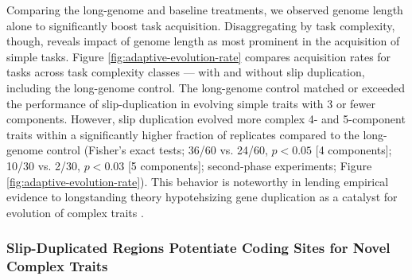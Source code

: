 Comparing the long-genome and baseline treatments, we observed genome length alone to significantly boost task acquisition.
Disaggregating by task complexity, though, reveals  impact of genome length as most prominent in the acquisition of simple tasks.
Figure \ref{fig:adaptive-evolution-rate} compares acquisition rates for tasks across task complexity classes --- with and without slip duplication, including the long-genome control.
The long-genome control matched or exceeded the performance of slip-duplication in evolving simple traits with 3 or fewer components.
However, slip duplication evolved more complex 4- and 5-component traits within a significantly higher fraction of replicates compared to the long-genome control (Fisher's exact tests; 36/60 vs. 24/60, $p<0.05$ [4 components]; 10/30 vs. 2/30, $p<0.03$ [5 components]; second-phase experiments; Figure \ref{fig:adaptive-evolution-rate}).
This behavior is noteworthy in lending empirical evidence to longstanding theory hypotehsizing gene duplication as a catalyst for evolution of complex traits \citep{ohno1970evolution}.

\subsubsection{Slip-Duplicated Regions Potentiate Coding Sites for Novel Complex Traits}

